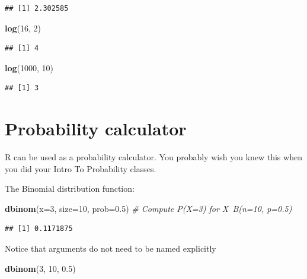 \documentclass[]{book}
\newenvironment{Shaded}{\begin{snugshade}}{\end{snugshade}}
\newcommand{\CommentTok}[1]{\textcolor[rgb]{0.56,0.35,0.01}{\textit{#1}}}
\newcommand{\DataTypeTok}[1]{\textcolor[rgb]{0.13,0.29,0.53}{#1}}
\newcommand{\DecValTok}[1]{\textcolor[rgb]{0.00,0.00,0.81}{#1}}
\newcommand{\FloatTok}[1]{\textcolor[rgb]{0.00,0.00,0.81}{#1}}
\newcommand{\KeywordTok}[1]{\textcolor[rgb]{0.13,0.29,0.53}{\textbf{#1}}}
\newcommand{\NormalTok}[1]{#1}
\theoremstyle{definition}
\theoremstyle{definition}
\theoremstyle{definition}
\theoremstyle{remark}
\begin{document}
\begin{verbatim}
## [1] 2.302585
\end{verbatim}

\begin{Shaded}
\begin{Highlighting}[]
\KeywordTok{log}\NormalTok{(}\DecValTok{16}\NormalTok{, }\DecValTok{2}\NormalTok{)                      }
\end{Highlighting}
\end{Shaded}

\begin{verbatim}
## [1] 4
\end{verbatim}

\begin{Shaded}
\begin{Highlighting}[]
\KeywordTok{log}\NormalTok{(}\DecValTok{1000}\NormalTok{, }\DecValTok{10}\NormalTok{)                   }
\end{Highlighting}
\end{Shaded}

\begin{verbatim}
## [1] 3
\end{verbatim}

\hypertarget{probability-calculator}{%
\section{Probability calculator}\label{probability-calculator}}

R can be used as a probability calculator.
You probably wish you knew this when you did your Intro To Probability classes.

The Binomial distribution function:

\begin{Shaded}
\begin{Highlighting}[]
\KeywordTok{dbinom}\NormalTok{(}\DataTypeTok{x=}\DecValTok{3}\NormalTok{, }\DataTypeTok{size=}\DecValTok{10}\NormalTok{, }\DataTypeTok{prob=}\FloatTok{0.5}\NormalTok{)  }\CommentTok{# Compute P(X=3) for X~B(n=10, p=0.5) }
\end{Highlighting}
\end{Shaded}

\begin{verbatim}
## [1] 0.1171875
\end{verbatim}

Notice that arguments do not need to be named explicitly

\begin{Shaded}
\begin{Highlighting}[]
\KeywordTok{dbinom}\NormalTok{(}\DecValTok{3}\NormalTok{, }\DecValTok{10}\NormalTok{, }\FloatTok{0.5}\NormalTok{)}
\end{Highlighting}
\end{Shaded}
\end{document}
